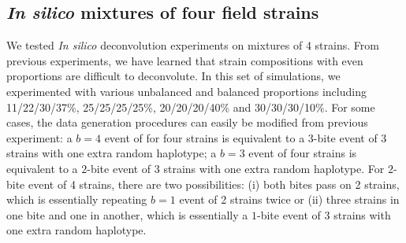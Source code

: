\documentclass[9pt,lineno]{elife}
\begin{document}
\begin{appendixbox}
\subsection{{\it In silico} mixtures of four field strains}
We tested {\it In silico} deconvolution experiments on mixtures of 4 strains. From previous experiments, we have learned that strain compositions with even proportions are difficult to deconvolute. In this set of simulations, we experimented with various unbalanced and balanced proportions including 11/22/30/37\%, 25/25/25/25\%, 20/20/20/40\% and 30/30/30/10\%. For some cases, the data generation procedures can easily be modified from previous experiment: a $b=4$ event of for four strains is equivalent to a $3$-bite event of 3 strains with one extra random haplotype; a $b=3$ event of four strains is equivalent to a $2$-bite event of 3 strains with one extra random haplotype. For $2$-bite event of 4 strains, there are two possibilities: (i) both bites pass on 2 strains, which is essentially repeating $b=1$ event of 2 strains twice or (ii) three strains in one bite and one in another, which is essentially a $1$-bite event of 3 strains with one extra random haplotype.
\end{appendixbox}
\end{document}
